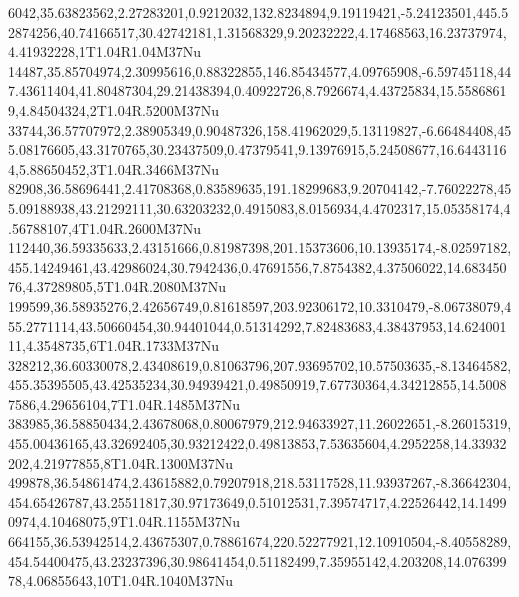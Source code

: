 6042,35.63823562,2.27283201,0.9212032,132.8234894,9.19119421,-5.24123501,445.52874256,40.74166517,30.42742181,1.31568329,9.20232222,4.17468563,16.23737974,4.41932228,1T1.04R1.04M37Nu
14487,35.85704974,2.30995616,0.88322855,146.85434577,4.09765908,-6.59745118,447.43611404,41.80487304,29.21438394,0.40922726,8.7926674,4.43725834,15.55868619,4.84504324,2T1.04R.5200M37Nu
33744,36.57707972,2.38905349,0.90487326,158.41962029,5.13119827,-6.66484408,455.08176605,43.3170765,30.23437509,0.47379541,9.13976915,5.24508677,16.64431164,5.88650452,3T1.04R.3466M37Nu
82908,36.58696441,2.41708368,0.83589635,191.18299683,9.20704142,-7.76022278,455.09188938,43.21292111,30.63203232,0.4915083,8.0156934,4.4702317,15.05358174,4.56788107,4T1.04R.2600M37Nu
112440,36.59335633,2.43151666,0.81987398,201.15373606,10.13935174,-8.02597182,455.14249461,43.42986024,30.7942436,0.47691556,7.8754382,4.37506022,14.68345076,4.37289805,5T1.04R.2080M37Nu
199599,36.58935276,2.42656749,0.81618597,203.92306172,10.3310479,-8.06738079,455.2771114,43.50660454,30.94401044,0.51314292,7.82483683,4.38437953,14.62400111,4.3548735,6T1.04R.1733M37Nu
328212,36.60330078,2.43408619,0.81063796,207.93695702,10.57503635,-8.13464582,455.35395505,43.42535234,30.94939421,0.49850919,7.67730364,4.34212855,14.50087586,4.29656104,7T1.04R.1485M37Nu
383985,36.58850434,2.43678068,0.80067979,212.94633927,11.26022651,-8.26015319,455.00436165,43.32692405,30.93212422,0.49813853,7.53635604,4.2952258,14.33932202,4.21977855,8T1.04R.1300M37Nu
499878,36.54861474,2.43615882,0.79207918,218.53117528,11.93937267,-8.36642304,454.65426787,43.25511817,30.97173649,0.51012531,7.39574717,4.22526442,14.14990974,4.10468075,9T1.04R.1155M37Nu
664155,36.53942514,2.43675307,0.78861674,220.52277921,12.10910504,-8.40558289,454.54400475,43.23237396,30.98641454,0.51182499,7.35955142,4.203208,14.07639978,4.06855643,10T1.04R.1040M37Nu
